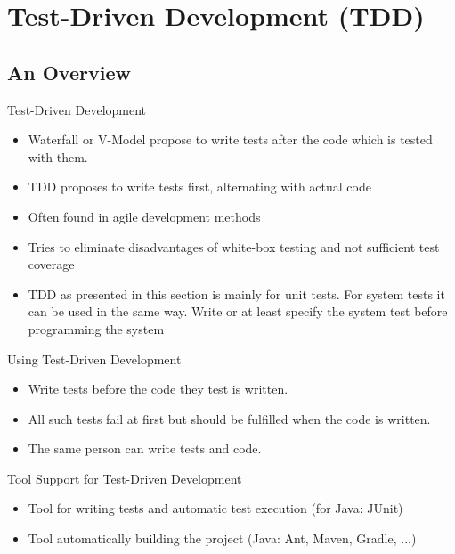 
\section{Test-Driven Development (TDD)}


\subsection*{An Overview}

\begin{frame}{Test-Driven Development}
\begin{itemize}
	\item Waterfall or V-Model propose to write tests after the code which is tested with them.
	\item TDD proposes to write tests first, alternating with actual code
	\item Often found in agile development methods
	\item Tries to eliminate disadvantages of white-box testing and not sufficient test coverage
	\item TDD as presented in this section is mainly for unit tests. For system tests it can be used in the same way. Write or at least specify the system test before programming the system
\end{itemize}
\end{frame}

\begin{frame}{Using Test-Driven Development}
\begin{itemize}
	\item Write tests before the code they test is written.
	\item All such tests fail at first but should be fulfilled when the code is written.
	\item The same person can write tests and code.
\end{itemize}
\end{frame}

\begin{frame}{Tool Support for Test-Driven Development}
\begin{itemize}
	\item Tool for writing tests and automatic test execution (for Java: JUnit)
	\item Tool automatically building the project (Java: Ant, Maven, Gradle, ...)
\end{itemize}
\end{frame}

